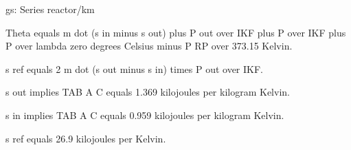gs: Series reactor/km

Theta equals m dot (s in minus s out) plus P out over IKF plus P over IKF plus P over lambda zero degrees Celsius minus P RP over 373.15 Kelvin.

s ref equals 2 m dot (s out minus s in) times P out over IKF.

s out implies TAB A C equals 1.369 kilojoules per kilogram Kelvin.

s in implies TAB A C equals 0.959 kilojoules per kilogram Kelvin.

s ref equals 26.9 kilojoules per Kelvin.
